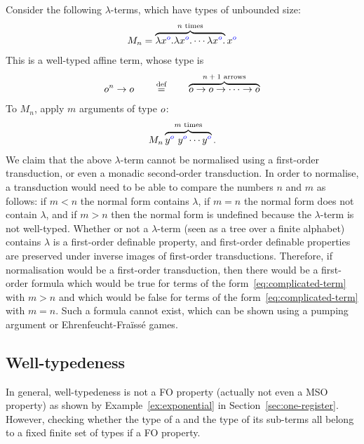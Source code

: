 \begin{example}\label{ex:affine-not-enough}
Consider the following $\lambda$-terms, which have types of 
unbounded size: 
\begin{align*}
M_n = \overbrace{\lambda {x}^{{\color{blue}o}}. \lambda {x}^{{\color{blue}o}}. \cdots \lambda {x}^{{\color{blue}o}}.}^{\text{$n$ times}} {x}^{{\color{blue}o}}
\end{align*}
This is a well-typed affine term, whose type is 
\begin{align*}
o^n \to o \qquad \stackrel{\text{def}}= \qquad  \overbrace{o \to o \to \cdots \to o}^{\text{$n+1$ arrows}}
\end{align*}
    To $M_n$, apply  $m$ arguments of type $o$:
    \begin{align}\label{eq:complicated-term}
    M_n \overbrace{{y}^{{\color{blue}o}} \ {y}^{{\color{blue}o}} \cdots {y}^{{\color{blue}o}} }^{\text{$m$ times}}.
    \end{align}
    We claim that the above $\lambda$-term cannot be normalised using a first-order transduction, or even a monadic second-order transduction. In order to normalise, a transduction would need to be able to compare the numbers $n$ and $m$ as follows:  if $m < n$  the normal form contains $\lambda$, if $m=n$  the normal form does not contain $\lambda$, and if $m > n$ then the normal form is undefined because the $\lambda$-term is not well-typed.  Whether or not a $\lambda$-term (seen as a tree over a finite alphabet) contains $\lambda$ is a first-order definable property, and first-order definable properties are preserved under inverse images of first-order transductions. Therefore, if normalisation would be a first-order transduction,
then there would be a first-order formula which would be true for terms of the form~\eqref{eq:complicated-term} with $m>n$ and which would be false for terms of the form~\eqref{eq:complicated-term} with $m=n$. Such a formula cannot exist, which can be shown using a pumping argument or Ehrenfeucht-Fra\"iss\'e games. 
\end{example}

\subsection{Well-typedeness} \label{sec:restrictions-are-fo}
In general, well-typedeness is not a FO property (actually not even a MSO property) as shown by Example~\ref{ex:exponential} in Section~\ref{sec:one-register}.
However, checking whether the type of a \lambdaterm and the type of its sub-terms all belong to a fixed finite set of types if a FO property. 

